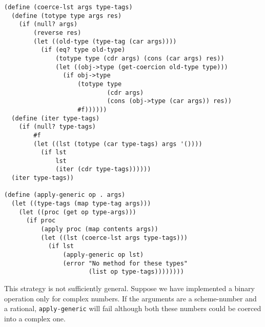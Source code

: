 \documentclass[a4paper,12pt]{article}
\begin{document}
\begin{lstlisting}
(define (coerce-lst args type-tags)
  (define (totype type args res)
    (if (null? args)
        (reverse res)
        (let ((old-type (type-tag (car args))))
          (if (eq? type old-type)
              (totype type (cdr args) (cons (car args) res)) 
              (let ((obj->type (get-coercion old-type type)))
                (if obj->type
                    (totype type
                            (cdr args)
                            (cons (obj->type (car args)) res))
                    #f))))))
  (define (iter type-tags)
    (if (null? type-tags)
        #f
        (let ((lst (totype (car type-tags) args '())))
          (if lst
              lst
              (iter (cdr type-tags))))))
  (iter type-tags))

(define (apply-generic op . args)
  (let ((type-tags (map type-tag args)))
    (let ((proc (get op type-args)))
      (if proc
          (apply proc (map contents args))
          (let ((lst (coerce-lst args type-tags)))
            (if lst
                (apply-generic op lst)
                (error "No method for these types"
                       (list op type-tags))))))))
\end{lstlisting}
This strategy is not sufficiently general.  Suppose we have
implemented a binary operation only for complex numbers.  If the
arguments are a scheme-number and a rational,
\lstinline!apply-generic! will fail although both these numbers could
be coerced into a complex one.
\end{document}
